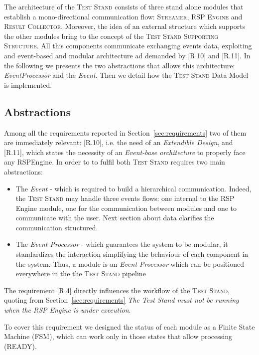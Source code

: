 The architecture of the \textsc{Test Stand} consists of three stand alone modules that establish a mono-directional communication flow: \textsc{Streamer}, \textsc{RSP Engine} and \textsc{Result Collector}. Moreover, the idea of an external structure which supports the other modules bring to the concept of the \textsc{Test Stand Supporting Structure}. All this components communicate exchanging events data, exploiting and event-based and modular architecture ad demanded by [R.10] and [R.11]. In the following we presents the two abstractions that allows this architecture: \textit{EventProcessor} and the \textit{Event}. Then we detail how the \textsc{Test Stand} Data Model is implemented.

\subsection{Abstractions}\label{sec:abstractions}

Among all the requirements reported in Section~\ref{sec:requirements} two of them are immediately relevant: [R.10], i.e. the need of an \textit{Extendible Design}, and [R.11], which states the necessity of an \textit{Event-base architecture} to properly face any RSPEngine. In order to to fulfil both \textsc{Test Stand} requires two main abstractions:
\begin{itemize}
\item The \textit{Event} - which is required to build a hierarchical communication. Indeed, the \textsc{Test Stand} may handle three events flows: one internal to the RSP Engine module, one for the communication between modules and one to communicate with the user. Next section about data clarifies the communication structured. 
\item The \textit{Event Processor} -  which guarantees the system to be modular, it standardizes the interaction simplifying the behaviour of each component in the system. Thus, a module is an \textit{Event Processor} which can be positioned everywhere in the the \textsc{Test Stand} pipeline
\end{itemize}

\noindent The requirement [R.4] directly influences the workflow of the \textsc{Test Stand}, quoting from Section~\ref{sec:requirements} \textit{The Test Stand must not be running when the RSP Engine is under execution}. 

To cover this requirement we designed the status of each module as a Finite State Machine (FSM), which can work only in those states that allow processing (READY). 

